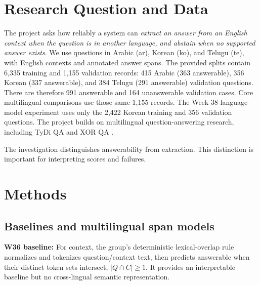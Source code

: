 \documentclass[11pt,a4paper,twocolumn]{article}
\begin{document}

\section{Research Question and Data}
The project asks how reliably a system can \emph{extract an answer from an English context when the question is in another language, and abstain when no supported answer exists}. We use questions in Arabic (ar), Korean (ko), and Telugu (te), with English contexts and annotated answer spans. The provided splits contain 6,335 training and 1,155 validation records: 415 Arabic (363 answerable), 356 Korean (337 answerable), and 384 Telugu (291 answerable) validation questions. There are therefore 991 answerable and 164 unanswerable validation cases. Core multilingual comparisons use those same 1,155 records. The Week 38 language-model experiment uses only the 2,422 Korean training and 356 validation questions. The project builds on multilingual question-answering
research, including TyDi QA \citep{clark2020tydi}
and XOR QA \citep{asai2021xor}.

The investigation distinguishes answerability from extraction. This distinction is important for interpreting scores and failures.

\section{Methods}
\subsection{Baselines and multilingual span models}
\textbf{W36 baseline:} For context, the group's deterministic lexical-overlap rule normalizes and tokenizes question/context text, then predicts answerable when their distinct token sets intersect, $|Q\cap C|\ge1$. It provides an interpretable baseline but no cross-lingual semantic representation.
\end{document}
